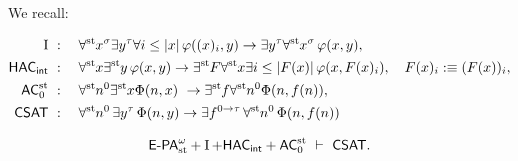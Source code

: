 

We recall:

\begin{align*}
\I\ &:\quad \forallst x^\sigma \exists y^\tau \forall i \leq |x| \, \varphi((x)_i, y) \to \exists y^\tau \forallst x^\sigma \, \varphi(x, y),\\
\HAC_\intern\ &:\quad  \forallst x \existsst y \, \phi(x,y) \to \existsst F \forallst x \exists i\leq |F(x)|\,  \phi (x,F(x)_i), \quad F(x)_i:\equiv(F(x))_i, \\
\AC_0^{\st}\ &:\quad \forallst n^0 \existsst x \Phi(n,x)\ \rightarrow \existsst f \forallst n^0 \Phi(n,f(n)),\\
\CSAT\ &:\quad \forallst n^0 \, \exists y^\tau \, \Phi(n, y) \to \exists f^{0 \to \tau} \, \forallst n^0 \, \Phi(n, f(n))
\end{align*}

\begin{thm}
\[
\epast+\I+\HAC_\intern+\AC_0^{\st}\ \vdash\ \CSAT.
\]
\end{thm}

